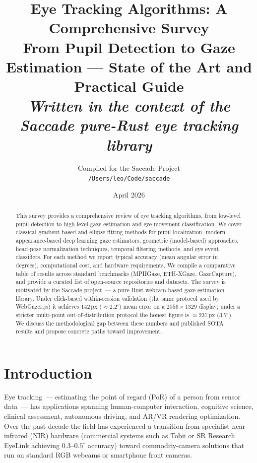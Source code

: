 \documentclass[11pt,a4paper]{article}
\title{\textbf{Eye Tracking Algorithms: A Comprehensive Survey}\\[0.5em]
\large From Pupil Detection to Gaze Estimation --- State of the Art and Practical Guide\\[0.5em]
\normalsize \textit{Written in the context of the Saccade pure-Rust eye tracking library}}
\author{Compiled for the Saccade Project\\
\texttt{/Users/leo/Code/saccade}}
\date{April 2026}
\begin{document}
\maketitle
\thispagestyle{fancy}

\begin{abstract}
This survey provides a comprehensive review of eye tracking algorithms, from low-level pupil detection to high-level gaze estimation and eye movement classification.
We cover classical gradient-based and ellipse-fitting methods for pupil localization, modern appearance-based deep learning gaze estimators, geometric (model-based) approaches, head-pose normalization techniques, temporal filtering methods, and eye event classifiers.
For each method we report typical accuracy (mean angular error in degrees), computational cost, and hardware requirements.
We compile a comparative table of results across standard benchmarks (MPIIGaze, ETH-XGaze, GazeCapture), and provide a curated list of open-source repositories and datasets.
The survey is motivated by the Saccade project~--- a pure-Rust webcam-based gaze estimation library.
Under click-based within-session validation (the same protocol used by WebGazer.js) it achieves $142\,\text{px}$ ($\approx 2.2^\circ$) mean error on a $2056\times 1329$ display; under a stricter multi-point out-of-distribution protocol the honest figure is $\approx 237\,\text{px}$ ($3.7^\circ$).
We discuss the methodological gap between these numbers and published SOTA results and propose concrete paths toward improvement.
\end{abstract}

\tableofcontents
\newpage

\section{Introduction}

Eye tracking~--- estimating the point of regard (PoR) of a person from sensor data~--- has applications spanning human-computer interaction, cognitive science, clinical assessment, autonomous driving, and AR/VR rendering optimization.
Over the past decade the field has experienced a transition from specialist near-infrared (NIR) hardware (commercial systems such as Tobii or SR Research EyeLink achieving $0.3$--$0.5^\circ$ accuracy) toward commodity-camera solutions that run on standard RGB webcams or smartphone front cameras.
\end{document}

